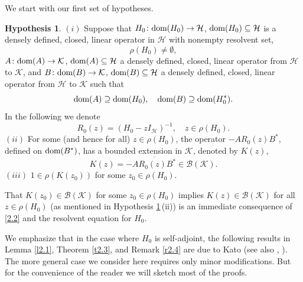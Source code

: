 \documentclass[reqno,10pt, centertags]{amsart}
\newcommand{\cB}{{\mathcal B}}
\newcommand{\cH}{{\mathcal H}}
\newcommand{\cK}{{\mathcal K}}
\newcommand{\lb}{\label}
\newcommand{\ol}{\overline}
\newcommand{\dom}{\text{\rm{dom}}}
\numberwithin{equation}{section}
\theoremstyle{definition}
\newtheorem{hypothesis}[theorem]{Hypothesis}
\begin{document}
We start with our first set of hypotheses.

\begin{hypothesis} \lb{h2.1}
$(i)$ Suppose that $H_0\colon\dom(H_0)\to\cH$,
$\dom(H_0)\subseteq\cH$ is a densely defined, closed, linear operator
in $\cH$ with nonempty resolvent set,
\begin{equation}
\rho(H_0)\neq\emptyset, \lb{2.1}
\end{equation}
$A\colon\dom(A)\to\cK$, $\dom(A)\subseteq\cH$ a densely defined,
closed, linear operator from $\cH$ to $\cK$, and
$B\colon\dom(B)\to\cK$, $\dom(B)\subseteq\cH$ a densely
defined, closed, linear operator from $\cH$ to $\cK$ such that
\begin{equation}
\dom(A)\supseteq\dom(H_0), \quad \dom(B)\supseteq\dom(H_0^*).
\lb{2.2}
\end{equation}
In the following we denote
\begin{equation}
R_0(z)=(H_0-zI_{\cH})^{-1}, \quad z\in \rho(H_0). \lb{2.3}
\end{equation}
$(ii)$ For some (and hence for all) $z\in\rho(H_0)$, the operator
$-AR_0(z)B^*$, defined on $\dom(B^*)$, has a
bounded extension in $\cK$, denoted by $K(z)$,
\begin{equation}
K(z)=-\ol{AR_0(z)B^*} \in\cB(\cK). \lb{2.4}
\end{equation}
$(iii)$ $1\in\rho(K(z_0))$ for some $z_0\in \rho(H_0)$.
\end{hypothesis}

That $K(z_0)\in\cB(\cK)$ for some $z_0\in\rho(H_0)$ implies
$K(z)\in\cB(\cK)$ for all $z\in\rho(H_0)$ (as mentioned in
Hypothesis \ref{h2.1}\,(ii)) is an immediate consequence of
\eqref{2.2} and the resolvent equation for $H_0$.

We emphasize that in the case where $H_0$ is self-adjoint, the
following results in Lemma \ref{l2.1}, Theorem \ref{t2.3}, and
Remark \ref{r2.4} are due to Kato \cite{Ka66} (see also \cite{Ho70},
\cite{KK66}). The more general case we consider here requires only
minor modifications. But for the convenience of the reader we will
sketch most of the proofs.
\end{document}

